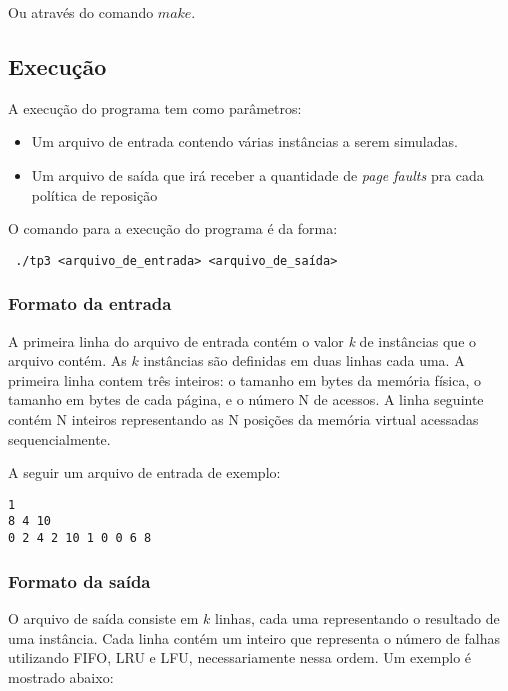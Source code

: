 \documentclass[12pt]{article}
\begin{document}
Ou através do comando $make$.

\subsection{Execução}

A execução do programa tem como parâmetros:
\begin{itemize}
\item Um arquivo de entrada contendo várias instâncias a serem simuladas.
\item Um arquivo de saída que irá receber a quantidade de \textit{page faults} pra cada política de reposição
\end{itemize}

O comando para a execução do programa é da forma:

\begin{footnotesize}
\begin{verbatim} ./tp3 <arquivo_de_entrada> <arquivo_de_saída>\end{verbatim}
\end{footnotesize}


\subsubsection{Formato da entrada}

A primeira linha do arquivo de entrada contém o valor \textit{k} de instâncias que o arquivo contém. As $k$ instâncias são definidas em duas linhas cada uma. A primeira linha contem três inteiros: o tamanho em bytes da memória física, o tamanho em bytes de cada página, e o número N de acessos. A linha seguinte contém N inteiros representando as N posições da memória virtual acessadas sequencialmente.

A seguir um arquivo de entrada de exemplo:

\begin{verbatim}
1
8 4 10
0 2 4 2 10 1 0 0 6 8
\end{verbatim}

\subsubsection{Formato da saída}

O arquivo de saída consiste em $k$ linhas, cada uma representando o resultado de uma instância. Cada linha contém um inteiro que representa o número de falhas utilizando FIFO, LRU e LFU, necessariamente nessa ordem. Um exemplo é mostrado abaixo:
\end{document}
